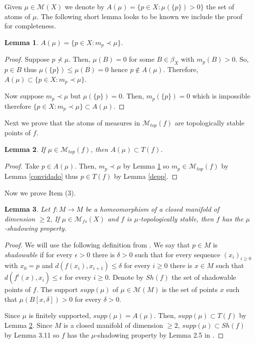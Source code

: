 \documentclass[11pt,letterpaper]{amsart}
\theoremstyle{plain}
\newtheorem{lemma}{Lemma}
\begin{document}
Given $\mu\in \mathcal{M}(X)$ we denote by $A(\mu)=\{p\in X:\mu(\{p\})>0\}$ the set of atoms of $\mu$. The following short lemma looks to be known we include the proof for completeness.

\begin{lemma}
\label{ross}
$A(\mu)=\{p\in X:m_p\prec \mu\}$.
\end{lemma}

\begin{proof}
Suppose $p\not\prec\mu$.
Then, $\mu(B)=0$ for some $B\in\beta_X$ with $m_p(B)>0$.
So, $p\in B$ thus $\mu(\{p\})\leq \mu(B)=0$ hence $p\notin A(\mu)$.
Therefore, $A(\mu)\subset \{p\in X:m_p\prec \mu\}$. 

Now suppose $m_p\prec \mu$ but $\mu(\{p\})=0$.
Then, $m_p(\{p\})=0$ which is impossible therefore $\{p\in X:m_p\prec \mu\}\subset A(\mu)$.
\end{proof}

Next we prove that the atoms of measures in $\mathcal{M}_{top}(f)$ are topologically stable points of $f$.


\begin{lemma}
\label{avo}
If $\mu\in \mathcal{M}_{top}(f)$, then $A(\mu)\subset T(f)$.
\end{lemma}

\begin{proof}
Take $p\in A(\mu)$. Then, $m_p\prec \mu$ by Lemma \ref{ross} so
$m_p\in\mathcal{M}_{top}(f)$ by Lemma \ref{convidado} thus
$p\in T(f)$ by Lemma \ref{depp}. 
\end{proof}





Now we prove Item (3).


\begin{lemma}
\label{louis}
Let $f:M\to M$ be a homeomorphism of a closed manifold of dimension $\geq2$, If
$\mu\in\mathcal{M}_{fs}(X)$ and $f$ is $\mu$-topologically stable, then $f$ has the $\mu$-shadowing property.
\end{lemma}

\begin{proof}
We will use the following definition from \cite{m}.
We say that $p\in M$ is {\em shadowable} if
for every $\epsilon>0$ there is $\delta>0$ such that
for every sequence $(x_i)_{i\geq0}$ with $x_0=p$ and $d(f(x_i),x_{i+1})\leq\delta$ for every $i\geq0$ there is $x\in M$ such that $d(f^i(x),x_i)\leq\epsilon$ for every $i\geq0$.
Denote by $Sh(f)$ the set of shadowable points of $f$.
The support $supp(\mu)$ of $\mu\in \mathcal{M}(M)$ is the set
of points $x$ such that $\mu(B[x,\delta])>0$ for every $\delta>0$.

Since $\mu$ is finitely supported, $supp(\mu)=A(\mu)$.
Then, $supp(\mu)\subset T(f)$ by Lemma \ref{avo}.
Since $M$ is a closed manifold of dimension $\geq2$,
$supp(\mu)\subset Sh(f)$ by Lemma 3.11 
so $f$ has the $\mu$-shadowing property by Lemma 2.5 in \cite{s}.
\end{proof}
\end{document}
